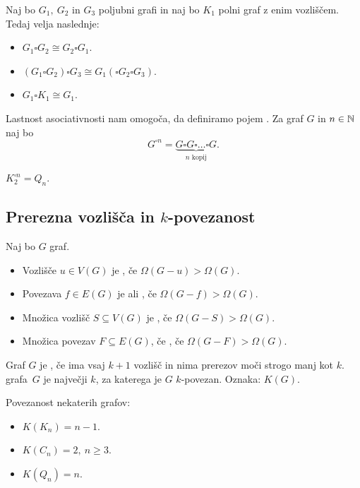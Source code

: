 \begin{trditev}
    Naj bo $G_1, \ G_2$ in $G_3$ poljubni grafi in naj bo $K_1$ polni graf z enim vozliščem. Tedaj velja naslednje:
    \begin{itemize}
        \item $G_1 \square G_2 \cong G_2 \square G_1$.
        \item $(G_1 \square G_2) \square G_3 \cong G_1 (\square G_2 \square G_3)$.
        \item $G_1 \square K_1 \cong G_1$.
    \end{itemize}
\end{trditev}

Lastnost asociativnosti nam omogoča, da definiramo pojem . Za graf $G$ in $n \in \mathbb{N}$ naj bo $$G^{\square n} = \underbrace{G \square G \square \ldots \square G}_\text{$n$ kopij}.$$

\begin{primer}
    $K_2^{\square n} = Q_n$.
\end{primer}

\subsection{Prerezna vozlišča in $k$-povezanost}
\begin{definicija}
    Naj bo $G$ graf.
    \begin{itemize}
        \item Vozlišče $u \in V(G)$ je , če $\Omega(G-u) > \Omega(G)$.
        \item Povezava $f \in E(G)$ je  ali , če $\Omega(G-f) > \Omega(G)$.
        \item Množica vozlišč $S \subseteq V(G)$ je , če $\Omega(G-S) > \Omega(G)$.
        \item Množica povezav $F \subseteq E(G)$, če , če $\Omega(G-F) > \Omega(G)$.
    \end{itemize}
\end{definicija}

\begin{definicija}
    Graf $G$ je , če ima vsaj $k+1$ vozlišč in nima prerezov moči strogo manj kot $k$.  grafa~$G$ je največji $k$, za katerega je $G$ $k$-povezan. Oznaka: $K(G)$.
\end{definicija}

\begin{primer}
    Povezanost nekaterih grafov:
    \begin{itemize}
        \item $K(K_n) = n-1$.
        \item $K(C_n) = 2, \ n \geq 3$.
        \item $K(Q_n) = n$.
    \end{itemize}
\end{primer}

